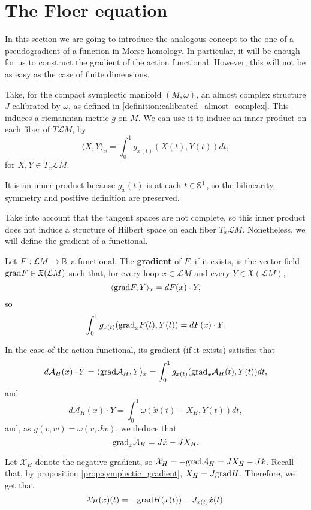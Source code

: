 \section{The Floer equation}

In this section we are going to introduce the analogous concept to the one of a pseudogradient of a function in Morse homology. In particular, it will be enough for us to construct the gradient of the action functional. However, this will not be as easy as the case of finite dimensions.

Take, for the compact symplectic manifold $(M,\omega)$, an almost complex structure $J$ calibrated by $\omega$, as defined in \ref{definition:calibrated_almost_complex}. This induces a riemannian metric $g$ on $M$. We can use it to induce an inner product on each fiber of $T\mathcal{L}M$, by
$$\langle X, Y \rangle_x = \int_0^1 g_{x(t)} (X(t), Y(t)) d t,$$
for $X,Y \in T_x\mathcal{L}M$.

It is an inner product because $g_x(t)$ is at each $t \in \mathbb{S}^1$, so the bilinearity, symmetry and positive definition are preserved.

Take into account that the tangent spaces are not complete, so this inner product does not induce a structure of Hilbert space on each fiber $T_x\mathcal{L}M$. Nonetheless, we will define the gradient of a functional.

\begin{deff}
Let $F : \mathcal{L}M \rightarrow \mathbb{R}$ a functional. The {\bf gradient} of $F$, if it exists, is the vector field $\mathrm{grad} F \in \mathfrak{X}(\mathcal{L}M)$ such that, for every loop $x \in \mathcal{L}M$ and every $Y \in \mathfrak{X}(\mathcal{L}M)$,
$$\langle \mathrm{grad} F, Y \rangle_x = d F(x) \cdot Y ,$$
so
$$\int_0^1 g_{x(t)}(\mathrm{grad}_xF(t),Y(t)) = d F(x) \cdot Y .$$
\end{deff}

In the case of the action functional, its gradient (if it exists) satisfies that
$$d \mathcal{A}_H(x) \cdot Y = \langle \mathrm{grad}\mathcal{A}_H, Y \rangle_x = \int_0^1 g_{x(t)}(\mathrm{grad}_x\mathcal{A}_H(t),Y(t)) d t ,$$
and
$$d \mathcal{A}_H(x) \cdot Y = \int_0^1 \omega(\dot{x}(t)-X_H,Y(t)) d t ,$$
and, as $g(v,w) = \omega(v,Jw)$, we deduce that
$$\mathrm{grad}_x\mathcal{A}_H = J\dot{x} - J X_H .$$

Let $\mathcal{X}_H$ denote the negative gradient, so $\mathcal{X}_H = - \mathrm{grad}\mathcal{A}_H = J X_H - J \dot{x}$. Recall that, by proposition \ref{prop:symplectic_gradient}, $X_H = J \mathrm{grad} H$. Therefore, we get that
$$\mathcal{X}_H(x)(t) = - \mathrm{grad} H(x(t)) - J_{x(t)} \dot{x}(t) .$$

